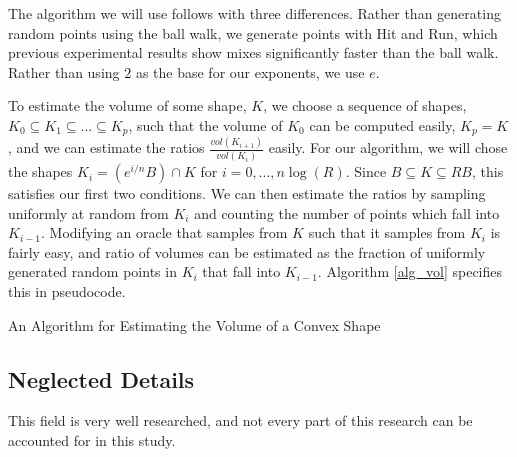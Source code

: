 The algorithm we will use follows %
with three differences. Rather than generating random points using the ball walk, we generate points with Hit and Run, which previous experimental results show mixes significantly faster than the ball walk. Rather than using $2$ as the base for our exponents, we use $e$.

To estimate the volume of some shape, $K$, we choose a sequence of shapes, $K_0 \subseteq K_1 \subseteq ... \subseteq K_p$, such that the volume of $K_0$ can be computed easily, $K_p = K$, and we can estimate the ratios $\frac{vol(K_{i+1})}{vol(K_i)}$ easily. For our algorithm, we will chose the shapes $K_i = (e^{i/n}B) \cap K$ for $i = 0, ..., n \log (R)$. Since $B \subseteq K \subseteq RB$, this satisfies our first two conditions. We can then estimate the ratios by sampling uniformly at random from $K_i$ and counting the number of points which fall into $K_{i-1}$. Modifying an oracle that samples from $K$ such that it samples from $K_i$ is fairly easy, and ratio of volumes can be estimated as the fraction of uniformly generated random points in $K_i$ that fall into $K_{i-1}$. Algorithm \ref{alg_vol} specifies this in pseudocode.

\begin{algorithm}
\SetAlgoLined
{}

\caption{An Algorithm for Estimating the Volume of a Convex Shape}\label{alg_vol}

\end{algorithm}

\subsection{Neglected Details}

This field is very well researched, and not every part of this research can be accounted for in this study.

